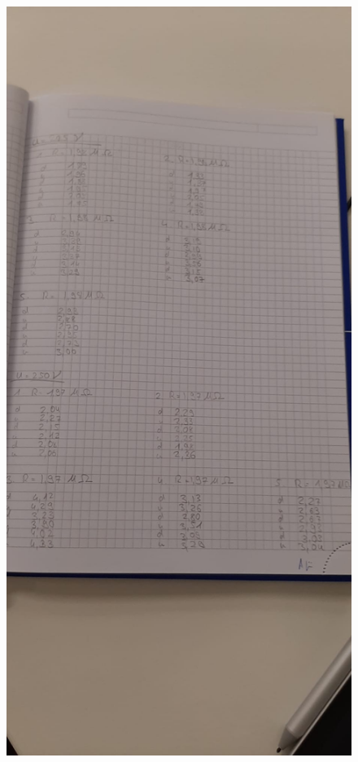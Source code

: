 \begin{figure}[H]
    \centering
    \includegraphics[width=\textwidth]{messdaten/U225&U250.jpeg}
\end{figure}